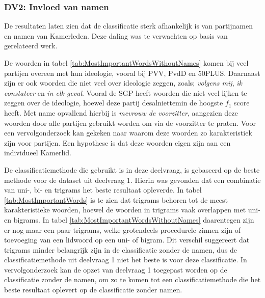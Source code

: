 \subsubsection{DV2: Invloed van namen}
De resultaten laten zien dat de classificatie sterk afhankelijk is van partijnamen en namen van Kamerleden. Deze daling was te verwachten op basis van gerelateerd werk.\par
De woorden in tabel \ref{tab:MostImportantWordsWithoutNames} komen bij veel partijen overeen met hun ideologie, vooral bij PVV, PvdD en 50PLUS. Daarnaast zijn er ook woorden die niet veel over ideologie zeggen, zoals; \textit{volgens mij}, \textit{ik constateer} en \textit{in elk geval}. Vooral de SGP heeft woorden die niet veel lijken te zeggen over de ideologie, hoewel deze partij desalniettemin de hoogste $f_1$ score heeft. Met name opvallend hierbij is \textit{mevrouw de voorzitter}, aangezien deze woorden door alle partijen gebruikt worden om via de voorzitter te praten. Voor een vervolgonderzoek kan gekeken naar waarom deze woorden zo karakteristiek zijn voor partijen. Een hypothese is dat deze woorden eigen zijn aan een individueel Kamerlid.\par
De classificatiemethode die gebruikt is in deze deelvraag, is gebaseerd op de beste methode voor de dataset uit deelvraag 1. Hierin was gevonden dat een combinatie van uni-, bi- en trigrams het beste resultaat opleverde. In tabel \ref{tab:MostImportantWords} is te zien dat trigrams behoren tot de meest karakteristieke woorden, hoewel de woorden in trigrams vaak overlappen met uni- en bigrams. In tabel \ref{tab:MostImportantWordsWithoutNames} daarentegen zijn er nog maar een paar trigrams, welke grotendeels procedurele zinnen zijn of toevoeging van een lidwoord op een uni- of bigram. Dit verschil suggereert dat trigrams minder belangrijk zijn in de classificatie zonder de namen, dus de classificatiemethode uit deelvraag 1 niet het beste is voor deze classificatie. In vervolgonderzoek kan de opzet van deelvraag 1 toegepast worden op de classificatie zonder de namen, om zo te komen tot een classificatiemethode die het beste resultaat oplevert op de classificatie zonder namen.\par 

